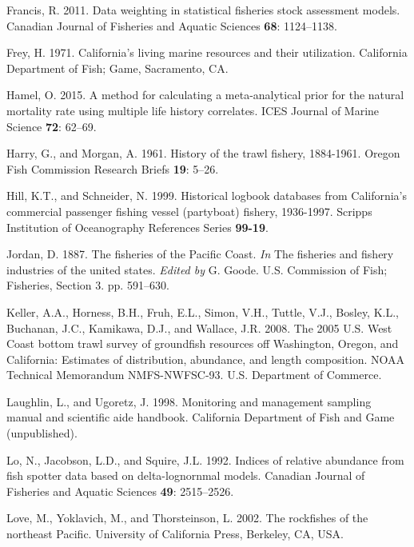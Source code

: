 \documentclass[12pt,]{article}
\begin{document}
\hypertarget{ref-Francis2011}{}
Francis, R. 2011. Data weighting in statistical fisheries stock
assessment models. Canadian Journal of Fisheries and Aquatic Sciences
\textbf{68}: 1124--1138.

\hypertarget{ref-Frey1971}{}
Frey, H. 1971. California's living marine resources and their
utilization. California Department of Fish; Game, Sacramento, CA.

\hypertarget{ref-Hamel2015}{}
Hamel, O. 2015. A method for calculating a meta-analytical prior for the
natural mortality rate using multiple life history correlates. ICES
Journal of Marine Science \textbf{72}: 62--69.

\hypertarget{ref-Harry1961}{}
Harry, G., and Morgan, A. 1961. History of the trawl fishery, 1884-1961.
Oregon Fish Commission Research Briefs \textbf{19}: 5--26.

\hypertarget{ref-Hill1999}{}
Hill, K.T., and Schneider, N. 1999. Historical logbook databases from
California's commercial passenger fishing vessel (partyboat) fishery,
1936-1997. Scripps Institution of Oceanography References Series
\textbf{99-19}.

\hypertarget{ref-Jordan1887}{}
Jordan, D. 1887. The fisheries of the Pacific Coast. \emph{In} The
fisheries and fishery industries of the united states. \emph{Edited by}
G. Goode. U.S. Commission of Fish; Fisheries, Section 3. pp. 591--630.

\hypertarget{ref-Keller2008}{}
Keller, A.A., Horness, B.H., Fruh, E.L., Simon, V.H., Tuttle, V.J.,
Bosley, K.L., Buchanan, J.C., Kamikawa, D.J., and Wallace, J.R. 2008.
The 2005 U.S. West Coast bottom trawl survey of groundfish resources off
Washington, Oregon, and California: Estimates of distribution,
abundance, and length composition. NOAA Technical Memorandum
NMFS-NWFSC-93. U.S. Department of Commerce.

\hypertarget{ref-Laughlin1998}{}
Laughlin, L., and Ugoretz, J. 1998. Monitoring and management sampling
manual and scientific aide handbook. California Department of Fish and
Game (unpublished).

\hypertarget{ref-Lo1992}{}
Lo, N., Jacobson, L.D., and Squire, J.L. 1992. Indices of relative
abundance from fish spotter data based on delta-lognornmal models.
Canadian Journal of Fisheries and Aquatic Sciences \textbf{49}:
2515--2526.

\hypertarget{ref-Love2002}{}
Love, M., Yoklavich, M., and Thorsteinson, L. 2002. The rockfishes of
the northeast Pacific. University of California Press, Berkeley, CA,
USA.
\end{document}
